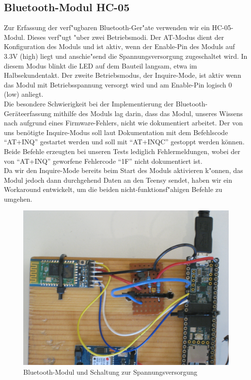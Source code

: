 \documentclass[a4paper,11pt, ngerman]{scrartcl}
\begin{document}
\subsection{Bluetooth-Modul HC-05}
Zur Erfassung der verf"ugbaren Bluetooth-Ger"ate verwenden wir ein HC-05-Modul. Dieses verf"ugt "uber zwei Betriebsmodi. Der AT-Modus dient der Konfiguration des Moduls und ist aktiv, wenn der Enable-Pin des Moduls auf 3.3V (high) liegt und anschie"send die Spannungsversorgung zugeschaltet wird. In diesem Modus blinkt die LED auf dem Bauteil langsam, etwa im Halbsekundentakt. Der zweite Betriebsmodus, der Inquire-Mode, ist aktiv wenn das Modul mit Betriebsspannung versorgt wird und am Enable-Pin logisch 0 (low) anliegt.\\
Die besondere Schwierigkeit bei der Implementierung der Bluetooth-Geräteerfassung mithilfe des Moduls lag darin, dass das Modul, unseres Wissens nach aufgrund eines Firmware-Fehlers, nicht wie dokumentiert arbeitet. Der von uns benötigte Inquire-Modus soll laut Dokumentation mit dem Befehlscode \enquote{AT+INQ} gestartet werden und soll mit \enquote{AT+INQC} gestoppt werden können. Beide Befehle erzeugten bei unseren Tests lediglich Fehlermeldungen, wobei der von \enquote{AT+INQ} geworfene Fehlercode \enquote{1F} nicht dokumentiert ist.\\
Da wir den Inquire-Mode bereits beim Start des Moduls aktivieren k"onnen, das Modul jedoch dann durchgehend Daten an den Teensy sendet, haben wir ein Workaround entwickelt, um die beiden nicht-funktionsf"ahigen Befehle zu umgehen.\\

\begin{figure}[H]
	\includegraphics[width=.95\linewidth]{BT.JPG}\caption{Bluetooth-Modul und Schaltung zur Spannungsversorgung}
\end{figure}
\end{document}
